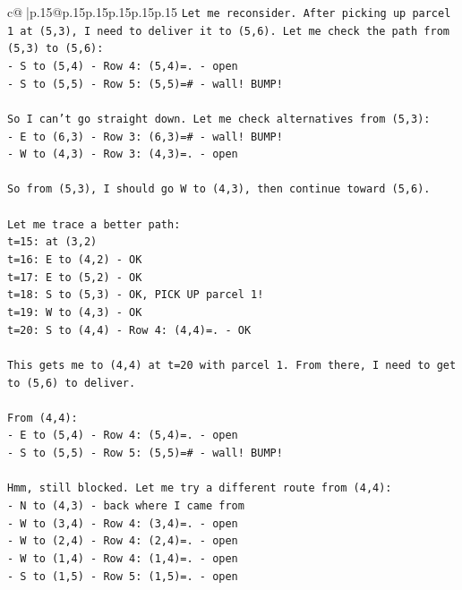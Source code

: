 \documentclass{article}
\begin{document}
{\begin{supertabular}{c@{$\;$}|p{.15\linewidth}@{}p{.15\linewidth}p{.15\linewidth}p{.15\linewidth}p{.15\linewidth}p{.15\linewidth}}
{{{\texttt{Let me reconsider. After picking up parcel 1 at (5,3), I need to deliver it to (5,6). Let me check the path from (5,3) to (5,6):} \\
\texttt{{-} S to (5,4) {-} Row 4: (5,4)=. {-} open} \\
\texttt{{-} S to (5,5) {-} Row 5: (5,5)=\# {-} wall! BUMP!} \\
\\ 
\texttt{So I can't go straight down. Let me check alternatives from (5,3):} \\
\texttt{{-} E to (6,3) {-} Row 3: (6,3)=\# {-} wall! BUMP!} \\
\texttt{{-} W to (4,3) {-} Row 3: (4,3)=. {-} open} \\
\\ 
\texttt{So from (5,3), I should go W to (4,3), then continue toward (5,6).} \\
\\ 
\texttt{Let me trace a better path:} \\
\texttt{t=15: at (3,2)} \\
\texttt{t=16: E to (4,2) {-} OK} \\
\texttt{t=17: E to (5,2) {-} OK} \\
\texttt{t=18: S to (5,3) {-} OK, PICK UP parcel 1!} \\
\texttt{t=19: W to (4,3) {-} OK} \\
\texttt{t=20: S to (4,4) {-} Row 4: (4,4)=. {-} OK} \\
\\ 
\texttt{This gets me to (4,4) at t=20 with parcel 1. From there, I need to get to (5,6) to deliver.} \\
\\ 
\texttt{From (4,4):} \\
\texttt{{-} E to (5,4) {-} Row 4: (5,4)=. {-} open} \\
\texttt{{-} S to (5,5) {-} Row 5: (5,5)=\# {-} wall! BUMP!} \\
\\ 
\texttt{Hmm, still blocked. Let me try a different route from (4,4):} \\
\texttt{{-} N to (4,3) {-} back where I came from} \\
\texttt{{-} W to (3,4) {-} Row 4: (3,4)=. {-} open} \\
\texttt{{-} W to (2,4) {-} Row 4: (2,4)=. {-} open} \\
\texttt{{-} W to (1,4) {-} Row 4: (1,4)=. {-} open} \\
\texttt{{-} S to (1,5) {-} Row 5: (1,5)=. {-} open} \\
}}}
\end{supertabular}}
\end{document}
